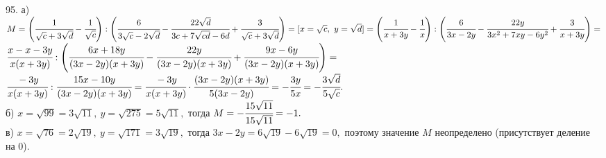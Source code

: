 95. а) $M=\left(\cfrac{1}{\sqrt{c}+3\sqrt{d}}-\cfrac{1}{\sqrt{c}}\right):\left(\cfrac{6}{3\sqrt{c}-2\sqrt{d}}-\cfrac{22\sqrt{d}}{3c+7\sqrt{cd}-6d}+\cfrac{3}{\sqrt{c}+3\sqrt{d}}\right)=
[x=\sqrt{c},\ y=\sqrt{d}]=
\left(\cfrac{1}{x+3y}-\cfrac{1}{x}\right):\left(\cfrac{6}{3x-2y}-\cfrac{22y}{3x^2+7xy-6y^2}+\cfrac{3}{x+3y}\right)=$\\$
\cfrac{x-x-3y}{x(x+3y)}:\left(\cfrac{6x+18y}{(3x-2y)(x+3y)}-\cfrac{22y}{(3x-2y)(x+3y)}+\cfrac{9x-6y}{(3x-2y)(x+3y)}\right)=$\\$
\cfrac{-3y}{x(x+3y)}:\cfrac{15x-10y}{(3x-2y)(x+3y)}=\cfrac{-3y}{x(x+3y)}\cdot\cfrac{(3x-2y)(x+3y)}{5(3x-2y)}=-\cfrac{3y}{5x}=-\cfrac{3\sqrt{d}}{5\sqrt{c}}.$\\
б) $x=\sqrt{99}=3\sqrt{11},\ y=\sqrt{275}=5\sqrt{11},$ тогда $M=-\cfrac{15\sqrt{11}}{15\sqrt{11}}=-1.$\\
в) $x=\sqrt{76}=2\sqrt{19},\ y=\sqrt{171}=3\sqrt{19},$ тогда $3x-2y=6\sqrt{19}-6\sqrt{19}=0,$ поэтому значение $M$ неопределено (присутствует деление на 0).\\

